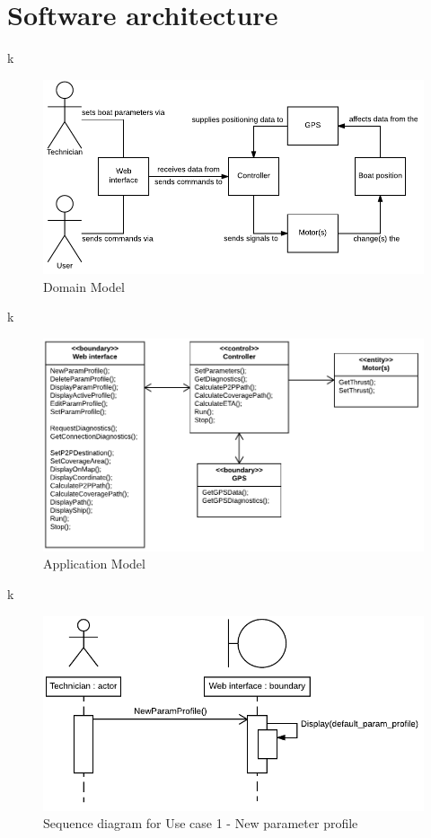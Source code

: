 \section{Software architecture}
k

\begin{figure}[H]
	\centering
	\includegraphics[width=1\linewidth]{Images/System_architecture/Domain_Model}
	\caption{Domain Model}
\end{figure}

k

\begin{figure}[H]
	\centering
	\includegraphics[width=1\linewidth]{Images/System_architecture/Application_Model}
	\caption{Application Model}
\end{figure}

k

\begin{figure}[H]
	\centering
	\includegraphics[width=1\linewidth]{Images/System_architecture/Use_case_1_SD}
	\caption{Sequence diagram for Use case 1 - New parameter profile}
\end{figure}

